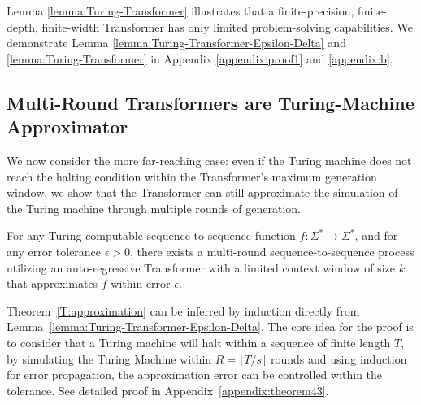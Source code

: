Lemma \ref{lemma:Turing-Transformer} illustrates that a finite-precision, finite-depth, finite-width Transformer has only limited problem-solving capabilities. We demonstrate Lemma \ref{lemma:Turing-Transformer-Epsilon-Delta} and \ref{lemma:Turing-Transformer} in Appendix \ref{appendix:proof1} and \ref{appendix:b}. 

\subsection{Multi-Round Transformers are Turing-Machine Approximator}
We now consider the more far-reaching case: even if the Turing machine does not reach the halting condition within the Transformer's maximum generation window, we show that the Transformer can still approximate the simulation of the Turing machine through multiple rounds of generation. %


\begin{theorem}[Approximability]\label{T:approximation}
    For any Turing-computable sequence-to-sequence function \( f: \Sigma^* \rightarrow \Sigma^* \), and for any error tolerance \( \epsilon > 0 \), there exists a multi-round sequence-to-sequence process utilizing an auto-regressive Transformer with a limited context window of size \( k \) that approximates \( f \) within error \( \epsilon \).
\end{theorem}

Theorem~\ref{T:approximation} can be inferred by induction directly from Lemma~\ref{lemma:Turing-Transformer-Epsilon-Delta}. The core idea for the proof is to consider that a Turing machine will halt within a sequence of finite length \(T\), by simulating the Turing Machine within \( R = \lceil T / s \rceil \) rounds and using induction for error propagation, the approximation error can be controlled within the tolerance. See detailed proof in Appendix~\ref{appendix:theorem43}.







